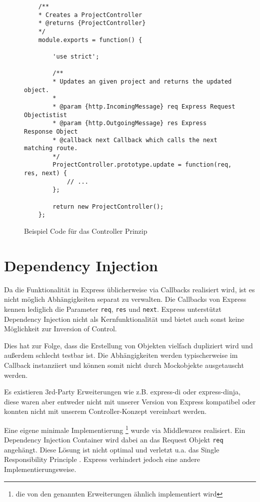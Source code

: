 \begin{figure}[t]
	\centering
	\begin{lstlisting}
	/**
	* Creates a ProjectController
	* @returns {ProjectController}
	*/
	module.exports = function() {
	
		'use strict';
		
		/**
		* Updates an given project and returns the updated object.
		*
		* @param {http.IncomingMessage} req Express Request Objectistist
		* @param {http.OutgoingMessage} res Express Response Object
		* @callback next Callback which calls the next matching route.
		*/
		ProjectController.prototype.update = function(req, res, next) {
			// ...
		};
		
		return new ProjectController();
	};
	\end{lstlisting}
	\caption[controller]{Beispiel Code für das Controller Prinzip}
	\label{f:controller}
\end{figure}

\section{Dependency Injection}\label{dependency-injection}

Da die Funktionalität in Express üblicherweise\cite{express-routing}
via Callbacks realisiert wird, ist es nicht möglich Abhängigkeiten
separat zu verwalten. Die Callbacks von Express kennen lediglich die
Parameter \texttt{req}, \texttt{res} und \texttt{next}. Express
unterstützt Dependency Injection nicht als Kernfunktionalität und bietet
auch sonst keine Möglichkeit zur Inversion of Control.

Dies hat zur Folge, dass die Erstellung von Objekten vielfach dupliziert
wird und außerdem schlecht testbar ist. Die Abhängigkeiten werden
typischerweise im Callback instanziiert und können somit nicht durch
Mockobjekte ausgetauscht werden.

Es existieren 3rd-Party Erweiterungen wie z.B. express-di\cite{express-di} oder
express-dinja\cite{express-dinja}, diese
waren aber entweder nicht mit unserer Version von Express kompatibel
oder konnten nicht mit unserem Controller-Konzept vereinbart werden.

Eine eigene minimale Implementierung \footnote{die von den genannten
Erweiterungen ähnlich implementiert wird} wurde via Middlewares
realisiert. Ein Dependency Injection Container wird dabei an das Request
Objekt \texttt{req} angehängt. Diese Lösung ist nicht optimal und
verletzt u.a. das Single Responsibility Principle
\cite{srp}. Express verhindert jedoch eine
andere Implementierungsweise.

